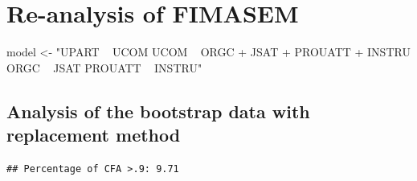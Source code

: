\documentclass[]{article}
\newenvironment{Shaded}{\begin{snugshade}}{\end{snugshade}}
\newcommand{\KeywordTok}[1]{\textcolor[rgb]{0.13,0.29,0.53}{\textbf{#1}}}
\newcommand{\DataTypeTok}[1]{\textcolor[rgb]{0.13,0.29,0.53}{#1}}
\newcommand{\DecValTok}[1]{\textcolor[rgb]{0.00,0.00,0.81}{#1}}
\newcommand{\FloatTok}[1]{\textcolor[rgb]{0.00,0.00,0.81}{#1}}
\newcommand{\StringTok}[1]{\textcolor[rgb]{0.31,0.60,0.02}{#1}}
\newcommand{\OperatorTok}[1]{\textcolor[rgb]{0.81,0.36,0.00}{\textbf{#1}}}
\newcommand{\NormalTok}[1]{#1}
\begin{document}
\section{Re-analysis of FIMASEM}\label{re-analysis-of-fimasem}

\begin{Shaded}
\begin{Highlighting}[]
\NormalTok{model <-}\StringTok{ "UPART ~ UCOM}
\StringTok{          UCOM ~ ORGC + JSAT + PROUATT + INSTRU}
\StringTok{          ORGC ~ JSAT}
\StringTok{          PROUATT ~ INSTRU"}
\end{Highlighting}
\end{Shaded}

\subsection{Analysis of the bootstrap data with replacement
method}\label{analysis-of-the-bootstrap-data-with-replacement-method}

\begin{Shaded}
\end{Shaded}

\begin{verbatim}
## Percentage of CFA >.9: 9.71
\end{verbatim}
\end{document}
